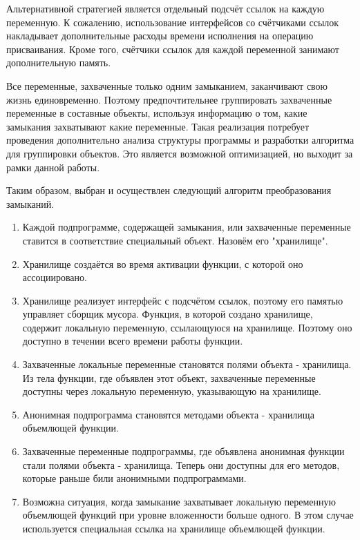 \documentclass{imcs}
\begin{document}
Альтернативной стратегией является отдельный подсчёт ссылок на каждую переменную. К сожалению, использование
интерфейсов со счётчиками ссылок накладывает дополнительные расходы времени исполнения на операцию
присваивания. Кроме того, счётчики ссылок для каждой переменной занимают дополнительную память.

Все переменные, захваченные только одним замыканием, заканчивают свою жизнь единовременно.
Поэтому предпочтительнее группировать захваченные переменные в составные объекты, используя информацию о том,
какие замыкания захватывают какие переменные. Такая реализация потребует проведения дополнительно
анализа структуры программы и разработки алгоритма для группировки объектов. Это является возможной оптимизацией,
но выходит за рамки данной работы.

Таким образом, выбран и осуществлен следующий алгоритм преобразования замыканий.

\begin{enumerate}
    \item Каждой подпрограмме, содержащей замыкания, или захваченные переменные ставится в соответствие специальный объект. Назовём его "хранилище".
    \item Хранилище создаётся во время активации функции, с которой оно ассоциировано. 
    \item Хранилище реализует интерфейс с подсчётом ссылок, поэтому его памятью управляет сборщик мусора. Функция, в которой создано хранилище, содержит локальную переменную, ссылающуюся на хранилище. Поэтому оно доступно в течении всего времени работы функции.
    \item Захваченные локальные переменные становятся полями объекта - хранилища. Из тела функции, где объявлен этот объект, захваченные переменные доступны через локальную переменную, указывающую на хранилище.
    \item Анонимная подпрограмма становятся методами объекта - хранилища объемлющей функции.
    \item Захваченные переменные подпрограммы, где объявлена анонимная функции стали полями объекта - хранилища.
Теперь они доступны для его методов, которые раньше били анонимными подпрограммами.
    \item Возможна ситуация, когда замыкание захватывает локальную переменную объемлющей функций
 при уровне вложенности больше одного. В этом случае используется специальная ссылка на хранилище
 объемлющей функции.
\end{enumerate}
\end{document}

